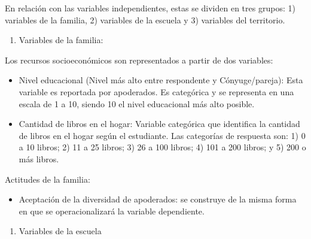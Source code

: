 \documentclass[12pt,twoside]{templates/facsothesis}
\providecommand{\tightlist}{%
  \setlength{\itemsep}{0pt}\setlength{\parskip}{0pt}}
\begin{document}
En relación con las variables independientes, estas se dividen en tres grupos: 1) variables de la familia, 2) variables de la escuela y 3) variables del territorio.

\begin{enumerate}
\def\labelenumi{\arabic{enumi})}
\tightlist
\item
  Variables de la familia:
\end{enumerate}

Los recursos socioeconómicos son representados a partir de dos variables:

\begin{itemize}
\item
  Nivel educacional (Nivel más alto entre respondente y Cónyuge/pareja): Esta variable es reportada por apoderados. Es categórica y se representa en una escala de 1 a 10, siendo 10 el nivel educacional más alto posible.
\item
  Cantidad de libros en el hogar: Variable categórica que identifica la cantidad de libros en el hogar según el estudiante. Las categorías de respuesta son: 1) 0 a 10 libros; 2) 11 a 25 libros; 3) 26 a 100 libros; 4) 101 a 200 libros; y 5) 200 o más libros.
\end{itemize}

Actitudes de la familia:

\begin{itemize}
\tightlist
\item
  Aceptación de la diversidad de apoderados: se construye de la misma forma en que se operacionalizará la variable dependiente.
\end{itemize}

\begin{enumerate}
\def\labelenumi{\arabic{enumi})}
\setcounter{enumi}{1}
\tightlist
\item
  Variables de la escuela
\end{enumerate}
\end{document}
